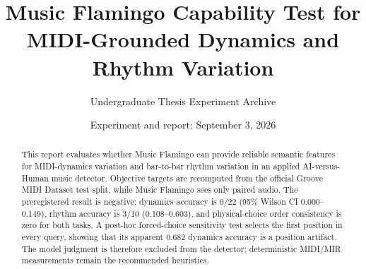 \documentclass[11pt,a4paper]{article}
\title{Music Flamingo Capability Test for\\
MIDI-Grounded Dynamics and Rhythm Variation}
\author{Undergraduate Thesis Experiment Archive}
\date{Experiment and report: September 3, 2026}
\begin{document}
\maketitle

\begin{abstract}
This report evaluates whether Music Flamingo can provide reliable semantic
features for MIDI-dynamics variation and bar-to-bar rhythm variation in an
applied AI-versus-Human music detector. Objective targets are recomputed from
the official Groove MIDI Dataset test split, while Music Flamingo sees only
paired audio. The preregistered result is negative: dynamics accuracy is 0/22
(95\% Wilson CI 0.000--0.149), rhythm accuracy is 3/10 (0.108--0.603), and
physical-choice order consistency is zero for both tasks. A post-hoc
forced-choice sensitivity test selects the first position in every query,
showing that its apparent 0.682 dynamics accuracy is a position artifact. The
model judgment is therefore excluded from the detector; deterministic MIDI/MIR
measurements remain the recommended heuristics.
\end{abstract}

\noindent{}

\tableofcontents
\listoffigures
\listoftables
\clearpage



\clearpage


\end{document}
